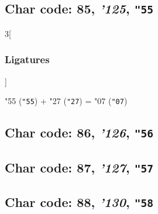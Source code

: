 \documentclass{article}
\newlength{\maxcharwidth}
\begin{document}
\subsection{Char code: 85, {\it'125}, {\tt"55}}
\label{char_85}


\begin{multicols}{3}[\subsubsection{Ligatures}]

{\testfont\char"55\noboundary} ({\tt"55}) + {\testfont\char"27\noboundary} ({\tt"27}) = {\testfont\char"07\noboundary} ({\tt"07}) 

\end{multicols}

\subsection{Char code: 86, {\it'126}, {\tt"56}}
\label{char_86}


\subsection{Char code: 87, {\it'127}, {\tt"57}}
\label{char_87}


\subsection{Char code: 88, {\it'130}, {\tt"58}}
\label{char_88}
\end{document}
